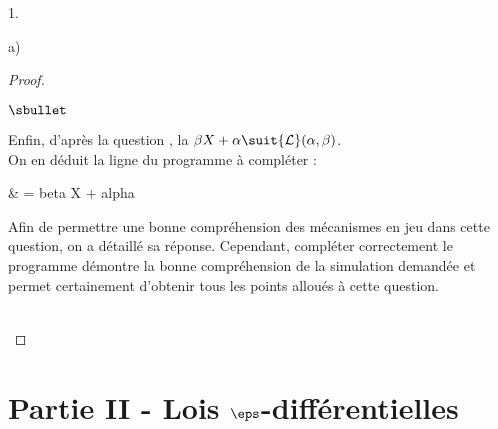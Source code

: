 \documentclass[11pt]{article}%
\begin{document}
\begin{noliste}{1.}
\begin{noliste}{a)}
\begin{proof}
\begin{noliste}{$\sbullet$}
      \item Enfin, d'après la question , la \var $\beta X +
        \alpha \suit {\cal L}(\alpha, \beta)$.\\
        On en déduit la ligne  du programme à compléter :
        \begin{scilabC}{7}
          & \qquad {} = beta \Sfois{} X + alpha 
        \end{scilabC}
      \end{noliste}
      \begin{remark}%
        Afin de permettre une bonne compréhension des mécanismes en
        jeu dans cette question, on a détaillé sa réponse. Cependant, 
	compléter correctement le programme
        \Scilab{} démontre la bonne compréhension de la simulation
        demandée et permet certainement d'obtenir tous les points
        alloués à cette question.%
      \end{remark}~\\[-1.4cm]
    \end{proof}
  \end{noliste}
\end{noliste}

\section*{Partie II - Lois $\eps$-différentielles}
\end{document}
